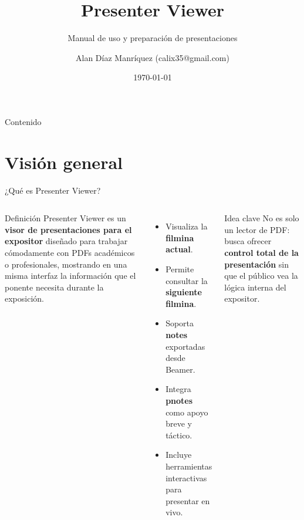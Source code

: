 \documentclass[aspectratio=169,professionalfonts]{beamer}
\title{Presenter Viewer}
\subtitle{Manual de uso y preparación de presentaciones}
\author{Alan Díaz Manríquez (calix35@gmail.com)}
\date{\today}
\newcommand{\bluebf}[1]{\textcolor{PVBlue}{\textbf{#1}}}
\begin{document}
\begin{frame}[plain]
  \titlepage
\end{frame}

\begin{frame}{Contenido}
\tableofcontents
{}
\end{frame}

\section{Visión general}

\begin{frame}{¿Qué es Presenter Viewer?}
\begin{columns}[T,totalwidth=\textwidth]
\begin{block}{Definición}
Presenter Viewer es un \bluebf{visor de presentaciones para el expositor} diseñado para trabajar cómodamente con PDFs académicos o profesionales, mostrando en una misma interfaz la información que el ponente necesita durante la exposición.
\end{block}

\begin{itemize}
  \item Visualiza la \bluebf{filmina actual}.
  \item Permite consultar la \bluebf{siguiente filmina}.
  \item Soporta \bluebf{notes} exportadas desde Beamer.
  \item Integra \bluebf{pnotes} como apoyo breve y táctico.
  \item Incluye herramientas interactivas para presentar en vivo.
\end{itemize}

\begin{exampleblock}{Idea clave}
No es solo un lector de PDF: busca ofrecer \bluebf{control total de la presentación} sin que el público vea la lógica interna del expositor.
\end{exampleblock}
\end{columns}

\end{frame}
\end{document}
